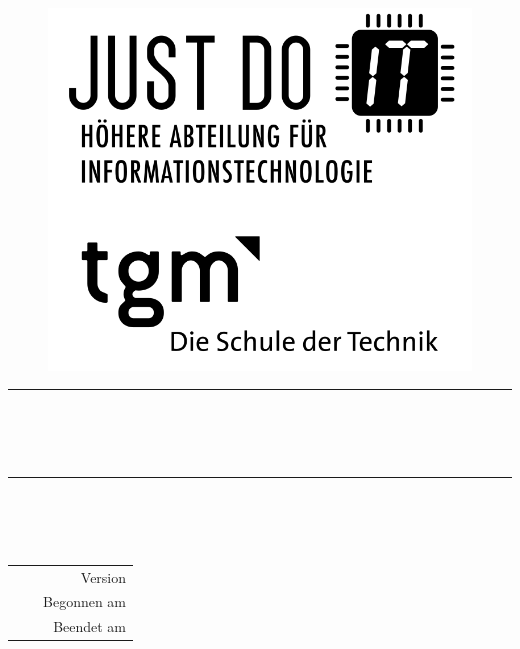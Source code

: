 
\begin{titlepage}
	\begin{figure}[!h]
		\begin{flushright}
			\includegraphics[width=0.3\linewidth]{images/jdIT_tgm.png}
		\end{flushright}
	\end{figure}

	\vspace{2.5cm} 

	{\begin{center} \bfseries\huge
			\rule{17.5cm}{0.1mm}  
			\\[5mm]
			\mytitle\\[5mm]
			\mythema\\
			\rule{17.5cm}{0.1mm}  
	\end{center}}

	{\begin{flushright} \bfseries\Large
			\vspace{2cm}
			\mysubject\\
			\mycourse\\[10mm]
			\myauthor\\[10mm]
	\end{flushright}}

	{\begin{table}[!h] \bfseries\normalsize
		\begin{tabularx}{\textwidth}{lXr @{\hspace{0mm}}}
			&& Version \myversion\\
			\mygrade && Begonnen am \mybegin\\
			\myteacher && Beendet am \myfinish\\
		\end{tabularx}
	\end{table}}

\end{titlepage}
